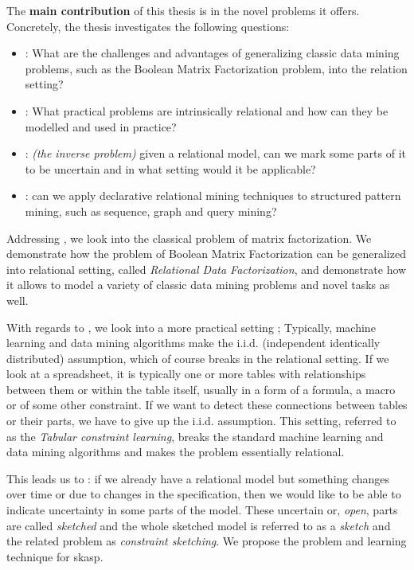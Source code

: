 The \textbf{main contribution} of this thesis is in the novel problems
it offers. Concretely, the thesis investigates the following questions:
\begin{itemize}
  \item \cone: What are the challenges and advantages of generalizing
    classic data mining problems, such as the Boolean Matrix
    Factorization problem, into the relation setting?
  \item \ctwo: What practical problems are intrinsically relational and
    how can they be modelled and used in practice?
  \item \cthree: \textit{(the inverse problem)} given a relational
    model, can we mark some parts of it to be uncertain and in what
    setting would it be applicable?
  \item \cfour: 
    can we apply declarative relational mining
    techniques to structured pattern mining, such as sequence, graph
    and query mining?
\end{itemize}

Addressing \cone, we look into the classical problem of matrix
factorization. We demonstrate how the problem of Boolean Matrix
Factorization can be generalized into relational setting, called
\textit{Relational Data Factorization}, and
demonstrate how it allows to model a variety of classic data mining
problems and novel tasks as well.

With regards to \ctwo, we look into a more practical setting ;
Typically, machine learning and data mining algorithms make the i.i.d.
(independent identically distributed) assumption, which of course
breaks in the relational setting. If we look at a spreadsheet, it is
typically one or more tables with relationships between them or
within the table itself, usually
in a form of a formula, a macro or of some other constraint. If we
want to detect these connections between tables or their parts, we
have to give up the i.i.d. assumption. This setting, referred to as the
\textit{Tabular constraint learning}, breaks the standard
machine learning and data mining algorithms and 
makes the problem essentially relational.

This leads us to \cthree: if we already have a relational model but
something changes over time or due to changes in the specification, then we would like
to be able to indicate uncertainty in some parts of the model. These
uncertain or, \textit{open}, parts are called \textit{sketched} and
the whole sketched model is referred to as a \textit{sketch} and the related
problem as \textit{constraint sketching}. We propose the problem and
learning technique for \acrlong{skasp}.


